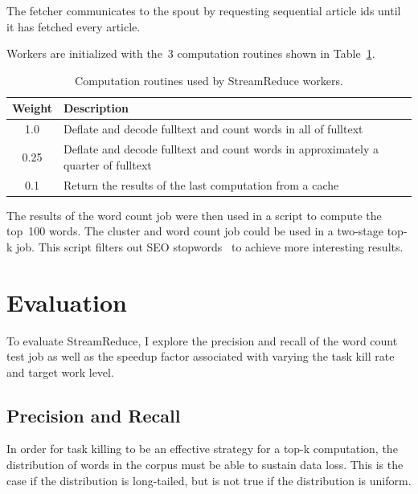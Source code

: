 \documentclass[12pt,twocolumn]{article}
\begin{document}
The fetcher communicates to the spout by requesting sequential article ids until it has fetched
every article.

Workers are initialized with the~3 computation routines shown in Table~\ref{table:workerTasks}.

\begin{table}
\begin{tabularx}{\linewidth}{|c|X|}
 \hline
Weight & Description \\ \hline
1.0 & Deflate and decode fulltext and count words in all of fulltext \\ \hline
0.25 & Deflate and decode fulltext and count words in approximately a quarter of fulltext \\ \hline
0.1 & Return the results of the last computation from a cache \\ \hline
\end{tabularx}
\caption{Computation routines used by StreamReduce workers.}
\label{table:workerTasks}
\end{table}

The results of the word count job were then used in a script to compute the top~100 words.
The cluster and word count job could be used in a two-stage top-k job. This script filters
out SEO stopwords~\cite{stopwords} to achieve more interesting results.

\section{Evaluation}
\label{sec:evaluation}
To evaluate StreamReduce, I explore the precision and recall of the word count test job as well as the
speedup factor associated with varying the task kill rate and target work level.

\subsection{Precision and Recall}
In order for task killing to be an effective strategy for a top-k computation, the
distribution of words in the corpus must be able to sustain data loss. This is the case
if the distribution is long-tailed, but is not true if the distribution is uniform.
\end{document}
